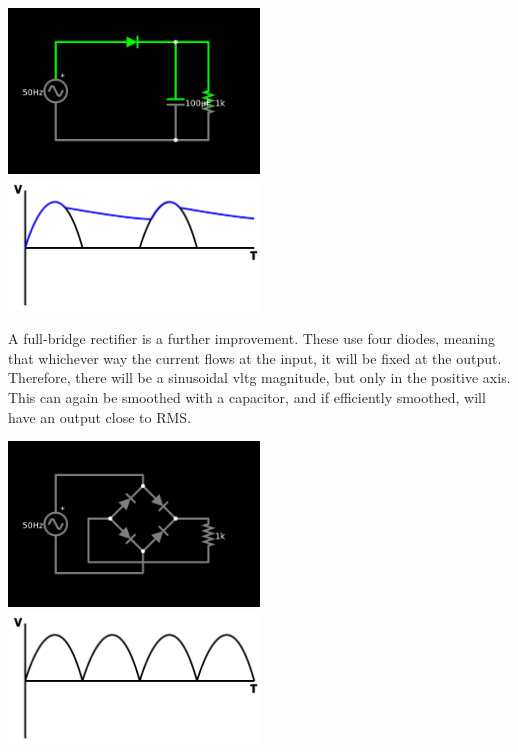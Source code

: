 \documentclass[a4paper,11pt]{report}
\begin{document}
\includegraphics[width=0.5\textwidth]{halfbridgesmoothed}
\includegraphics[width=0.5\textwidth]{halfbridgewavesmoothed}

\vspace*{1\baselineskip}

A full-bridge rectifier is a further improvement. These use four diodes, meaning that whichever way the current flows at the input, it will be fixed at the output. Therefore, there will be a sinusoidal \gls{vltg} magnitude, but only in the positive axis. This can again be smoothed with a capacitor, and if efficiently smoothed, will have an output close to RMS.

\vspace*{1\baselineskip}

\includegraphics[width=0.5\textwidth]{fullbridge}
\includegraphics[width=0.5\textwidth]{fullbridgewave}

\vspace*{1\baselineskip}
\end{document}
